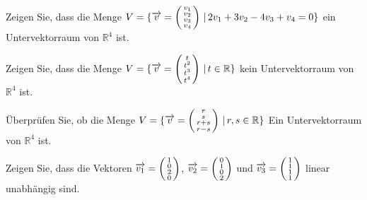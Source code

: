 \bigbreak

\begin{aufgabe} Zeigen Sie, dass die Menge  $V = \{ \overrightarrow{v} = \left( \begin{smallmatrix} 
v_1 \\ v_2 \\ v_3 \\ v_4  \end{smallmatrix} \right) \, \vert \, 2 v_1 + 3 v_2 - 4 v_3 + v_4 = 0 \}$ 
ein Untervektorraum von $\mathbb R^4$ ist.
\end{aufgabe}

\begin{aufgabe} Zeigen Sie, dass die Menge  $V = \{ \overrightarrow{v} = \left( \begin{smallmatrix} t 
\\ t^2 \\ t^3 \\ t^4\end{smallmatrix} \right) \, \vert \, t \in \mathbb R \}$ 
kein Untervektorraum von $\mathbb R^4$ ist.
\end{aufgabe}

\begin{aufgabe} Überprüfen Sie, ob die Menge $ V = \{ \overrightarrow{v} = 
\left( \begin{smallmatrix} r \\ s \\ r+s \\ r-s  \end{smallmatrix} \right) \, \vert \, 
r, s \in \mathbb R \}$ Ein Untervektorraum von $\mathbb R^4$ ist.
\end{aufgabe}

\begin{aufgabe} Zeigen Sie, dass die Vektoren  $\overrightarrow{v_1} = 
\left( \begin{smallmatrix} 1 \\ 0 \\ 2 \\ 0
\end{smallmatrix} \right)$, $\overrightarrow{v_2} = \left( \begin{smallmatrix} 0 \\ 1 \\ 0 \\ 2 
\end{smallmatrix} \right)$ und $\overrightarrow{v_3} = \left( \begin{smallmatrix} 1 \\ 1 \\ 1 \\ 1 
\end{smallmatrix} \right)$ linear unabhängig sind.
\end{aufgabe}

